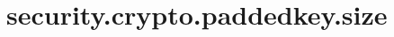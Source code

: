 \section{security.crypto.paddedkey.size}
\label{configuration:SecurityCryptoPaddedkeySize}
\AvailableInJavaOnly{\TODO}